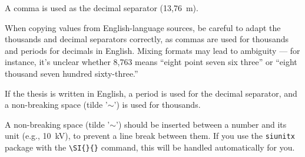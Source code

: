 A comma is used as the decimal separator (13,76~m).

When copying values from English-language sources, be careful to adapt the thousands and decimal separators correctly, as commas are used for thousands and periods for decimals in English. Mixing formats may lead to ambiguity — for instance, it's unclear whether 8,763 means “eight point seven six three” or “eight thousand seven hundred sixty-three.”

If the thesis is written in English, a period is used for the decimal separator, and a non-breaking space (tilde '$\sim$') is used for thousands.

A non-breaking space (tilde '$\sim$') should be inserted between a number and its unit (e.g., 10~kV), to prevent a line break between them. If you use the \texttt{siunitx} package with the \verb|\SI{}{}| command, this will be handled automatically for you.